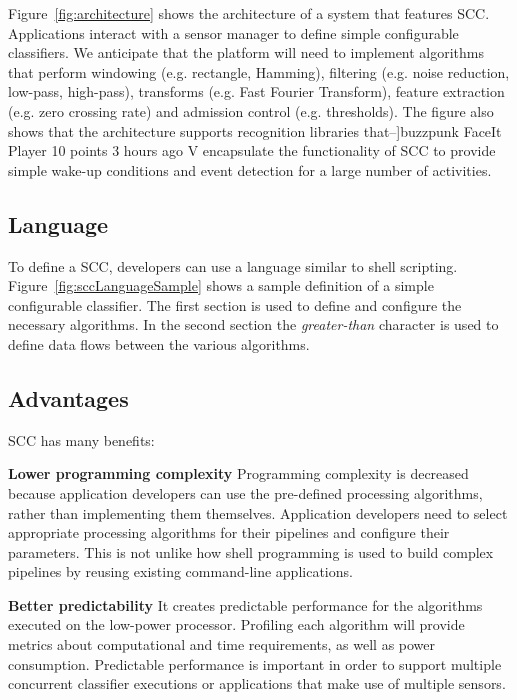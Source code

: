 Figure~\ref{fig:architecture} shows the architecture of a
system that features SCC.  Applications interact with a sensor 
manager to define simple configurable classifiers.  We anticipate 
that the platform will need to implement algorithms
that perform windowing (e.g. rectangle, Hamming), filtering (e.g.
noise reduction, low-pass, high-pass), transforms (e.g. Fast Fourier
Transform), feature extraction (e.g. zero crossing rate) and admission
control (e.g. thresholds).  The figure also shows that the 
architecture supports recognition libraries that–]buzzpunk FaceIt Player 10 points 3 hours ago 
V
encapsulate the functionality of SCC to provide simple
wake-up conditions and event detection for a large number of 
activities. 

  

\subsection{Language}

To define a SCC, developers can use a language similar to shell
scripting.  Figure~\ref{fig:sccLanguageSample} shows a sample
definition of a simple configurable classifier.  The first section is used
to define and configure the necessary algorithms.  In the second section the
{\em greater-than} character is used to define data flows between the 
various algorithms. 

\subsection{Advantages}

SCC has many benefits:

 {\bf Lower programming complexity}  Programming complexity is
  decreased because application developers can use the pre-defined
  processing algorithms, rather than implementing them themselves. 
  Application developers need to select appropriate processing 
  algorithms for their pipelines and configure their parameters. This 
  is not unlike how shell programming is used to build complex 
  pipelines by reusing existing command-line applications.
  

{\bf Better predictability} It 
  creates predictable performance for the algorithms executed on the
  low-power processor. Profiling each algorithm will provide metrics
  about computational and time requirements, as well as power
  consumption.  Predictable performance is important in order to
  support multiple concurrent classifier executions or applications
  that make use of multiple sensors.


